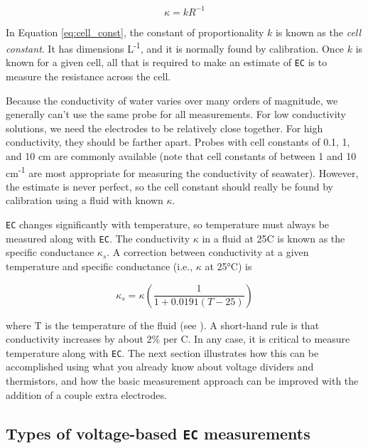 \begin{equation}\label{eq:cell_const}
	\kappa= kR^{-1}
\end{equation}
 
In Equation \ref{eq:cell_const}, the constant of proportionality $k$ is known as the \emph{cell constant}.  It has dimensions L\textsuperscript{-1}, and it is normally found by calibration. Once $k$ is known for a given cell, all that is required to make an estimate of \texttt{EC} is to measure the resistance across the cell.  

Because the conductivity of water varies over many orders of magnitude, we generally can’t use the same probe for all measurements.  For low conductivity solutions, we need the electrodes to be relatively close together.  For high conductivity, they should be farther apart. Probes with cell constants of 0.1, 1, and 10 cm are commonly available (note that cell constants of between 1 and 10 cm\textsuperscript{-1} are most appropriate for measuring the conductivity of seawater). However, the estimate is never perfect, so the cell constant should really be found by calibration using a fluid with known $\kappa$.

\texttt{EC} changes significantly with temperature, so temperature must always be measured along with \texttt{EC}. The conductivity $\kappa$ in a fluid at 25\textdegree C is known as the specific conductance $\kappa_s$.  A correction between conductivity at a given temperature and specific conductance (i.e., $\kappa$ at 25°C) is

\begin{equation}\label{eq:ec_temp}
	\kappa_s = \kappa\left (\frac{1}{1+0.0191\left ( T-25 \right )}\right )
\end{equation}

where T is the temperature of the fluid (see ).  A short-hand rule is that conductivity increases by about 2\% per \textdegree C.  In any case, it is critical to measure temperature along with \texttt{EC}. The next section illustrates how this can be accomplished using what you already know about voltage dividers and thermistors, and how the basic measurement approach can be improved with the addition of a couple extra electrodes.

\subsection{Types of voltage-based \texttt{EC} measurements}

